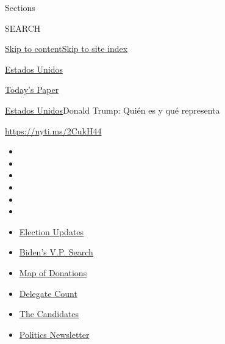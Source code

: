 Sections

SEARCH

\protect\hyperlink{site-content}{Skip to
content}\protect\hyperlink{site-index}{Skip to site index}

\href{https://www.nytimes.com/es/section/estados-unidos}{Estados Unidos}

\href{https://myaccount.nytimes.com/auth/login?response_type=cookie\&client_id=vi}{}

\href{https://www.nytimes.com/section/todayspaper}{Today's Paper}

\href{/es/section/estados-unidos}{Estados Unidos}\textbar{}Donald Trump:
Quién es y qué representa

\url{https://nyti.ms/2CukH44}

\begin{itemize}
\item
\item
\item
\item
\item
\item
\end{itemize}

\begin{itemize}
\item
  \href{https://www.nytimes.com/2020/07/31/us/elections/biden-vs-trump.html?action=click\&pgtype=Article\&state=default\&region=TOP_BANNER\&context=storylines_menu}{Election
  Updates}
\item
  \href{https://www.nytimes.com/article/biden-vice-president-2020.html?action=click\&pgtype=Article\&state=default\&region=TOP_BANNER\&context=storylines_menu}{Biden's
  V.P. Search}
\item
  \href{https://www.nytimes.com/interactive/2020/07/24/us/politics/trump-biden-campaign-donors.html?action=click\&pgtype=Article\&state=default\&region=TOP_BANNER\&context=storylines_menu}{Map
  of Donations}
\item
  \href{https://www.nytimes.com/interactive/2020/us/elections/delegate-count-primary-results.html?action=click\&pgtype=Article\&state=default\&region=TOP_BANNER\&context=storylines_menu}{Delegate
  Count}
\item
  \href{https://www.nytimes.com/interactive/2019/us/politics/2020-presidential-candidates.html?action=click\&pgtype=Article\&state=default\&region=TOP_BANNER\&context=storylines_menu}{The
  Candidates}
\item
  \href{https://www.nytimes.com/newsletters/politics?action=click\&pgtype=Article\&state=default\&region=TOP_BANNER\&context=storylines_menu}{Politics
  Newsletter}
\end{itemize}

